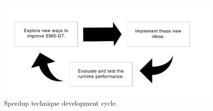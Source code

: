 \begin{figure}[h]
	\centering
	\includegraphics[width=5.5in]{contents/00_images/methodology}
	\caption{Speedup technique development cycle.}
	\label{fig:methodology}
\end{figure} 